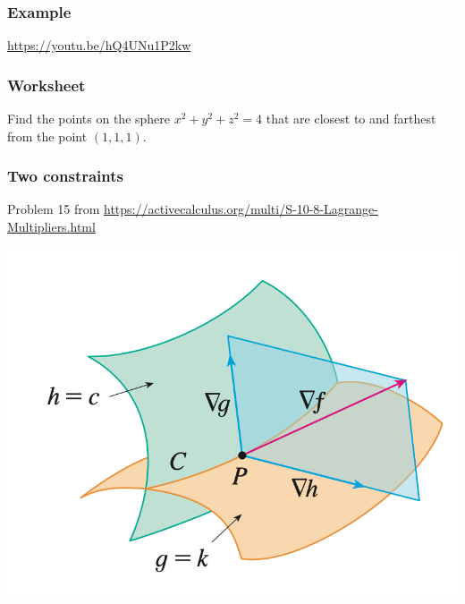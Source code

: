 \documentclass[aspectratio=169]{beamer}
\begin{document}
\begin{frame}
    \frametitle{Example}
    \url{https://youtu.be/hQ4UNu1P2kw}
\end{frame}

\begin{frame}
    \frametitle{Worksheet}
         Find the points on the sphere $x^2 + y^2 + z^2 =4$
            that are closest to and farthest from the point 
            $(1,1,1)$.
\end{frame}

\begin{frame}
    \frametitle{Two constraints}
        Problem 15 from \url{https://activecalculus.org/multi/S-10-8-Lagrange-Multipliers.html}

        \includegraphics[scale=0.5]{two-constraints.png}
\end{frame}
\end{document}
